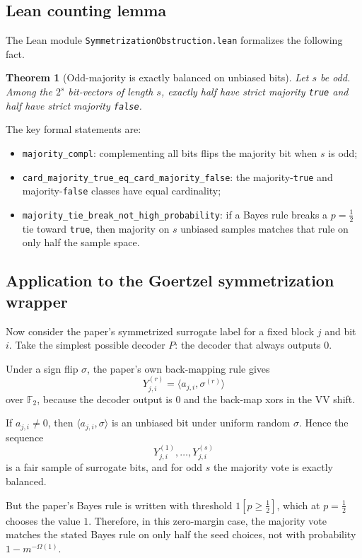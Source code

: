 \documentclass[11pt]{article}
\newtheorem{theorem}{Theorem}[section]
\theoremstyle{remark}
\begin{document}
\subsection{Lean counting lemma}

The Lean module \texttt{SymmetrizationObstruction.lean} formalizes the following fact.

\begin{theorem}[Odd-majority is exactly balanced on unbiased bits]
Let \(s\) be odd.  Among the \(2^s\) bit-vectors of length \(s\), exactly half have strict majority
\texttt{true} and half have strict majority \texttt{false}.
\end{theorem}

\noindent
The key formal statements are:
\begin{itemize}[leftmargin=1.5em]
  \item \texttt{majority\_compl}: complementing all bits flips the majority bit when \(s\) is odd;
  \item \texttt{card\_majority\_true\_eq\_card\_majority\_false}: the majority-\texttt{true} and
  majority-\texttt{false} classes have equal cardinality;
  \item \texttt{majority\_tie\_break\_not\_high\_probability}: if a Bayes rule breaks a
  \(p=\tfrac12\) tie toward \texttt{true}, then majority on \(s\) unbiased samples matches that rule
  on only half the sample space.
\end{itemize}

\subsection{Application to the Goertzel symmetrization wrapper}

Now consider the paper's symmetrized surrogate label for a fixed block \(j\) and bit \(i\).  Take
the simplest possible decoder \(P\): the decoder that always outputs \(0\).

Under a sign flip \(\sigma\), the paper's own back-mapping rule gives
\[
  Y^{(r)}_{j,i} = \langle a_{j,i}, \sigma^{(r)} \rangle
\]
over \(\mathbb{F}_2\), because the decoder output is \(0\) and the back-map xors in the VV shift.

If \(a_{j,i} \neq 0\), then \(\langle a_{j,i}, \sigma \rangle\) is an unbiased bit under uniform random
\(\sigma\).  Hence the sequence
\[
  Y^{(1)}_{j,i}, \dots, Y^{(s)}_{j,i}
\]
is a fair sample of surrogate bits, and for odd \(s\) the majority vote is exactly balanced.

But the paper's Bayes rule is written with threshold \(1[p \ge \tfrac12]\), which at \(p=\tfrac12\)
chooses the value \(1\).  Therefore, in this zero-margin case, the majority vote matches the stated
Bayes rule on only half the seed choices, not with probability \(1 - m^{-\Omega(1)}\).
\end{document}
